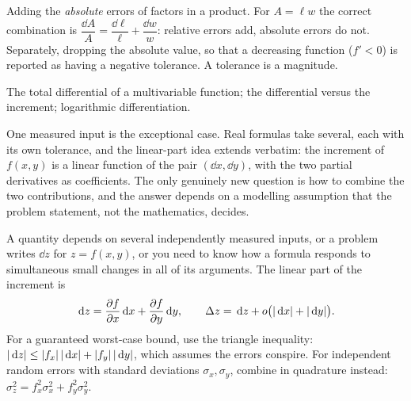 \begin{trap}
Adding the \emph{absolute} errors of factors in a product. For $A=\ell w$ the correct combination is $\dfrac{\dd A}{A}=\dfrac{\dd\ell}{\ell}+\dfrac{\dd w}{w}$: relative errors add, absolute errors do not. Separately, dropping the absolute value, so that a decreasing function ($f'<0$) is reported as having a negative tolerance. A tolerance is a magnitude.
\end{trap}

\begin{seealsob}The total differential of a multivariable function; the differential versus the increment; logarithmic differentiation.\end{seealsob}

One measured input is the exceptional case. Real formulas take several, each with its own tolerance, and the linear-part idea extends verbatim: the increment of $f(x,y)$ is a linear function of the pair $(\dd x,\dd y)$, with the two partial derivatives as coefficients. The only genuinely new question is how to combine the two contributions, and the answer depends on a modelling assumption that the problem statement, not the mathematics, decides.

\cue A quantity depends on several independently measured inputs, or a problem writes $\dd z$ for $z=f(x,y)$, or you need to know how a formula responds to simultaneous small changes in all of its arguments.
\method The linear part of the increment is
\[\,\mathrm{d} z=\frac{\partial f}{\partial x}\,\mathrm{d} x+\frac{\partial f}{\partial y}\,\mathrm{d} y,\qquad \Delta z=\,\mathrm{d} z+o\bigl(\left\lvert \,\mathrm{d} x\right\rvert+\left\lvert \,\mathrm{d} y\right\rvert\bigr).\]
For a guaranteed worst-case bound, use the triangle inequality: $\left\lvert \,\mathrm{d} z\right\rvert\leq\left\lvert f_x\right\rvert\left\lvert \,\mathrm{d} x\right\rvert+\left\lvert f_y\right\rvert\left\lvert \,\mathrm{d} y\right\rvert$, which assumes the errors conspire. For independent random errors with standard deviations $\sigma_x,\sigma_y$, combine in quadrature instead: $\sigma_z^{2}=f_x^{2}\sigma_x^{2}+f_y^{2}\sigma_y^{2}$.

